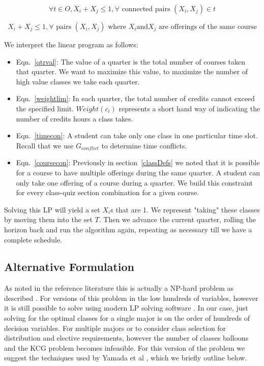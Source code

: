 \documentclass[11pt]{article} %
\begin{document}
\begin{equation}
    \forall t \in O,X_i+X_j \leq 1, \forall \text{ connected pairs } (X_i,X_j) \in t
    \label{timecon}
\end{equation}

\begin{equation}
   X_i + X_j \leq 1, \forall \text{ pairs } (X_i,X_j) \text{ where } X_i \text{and} X_j \text{ are offerings of
   the same course}
    \label{coursecon}
\end{equation}

We interpret the linear program as follows: \begin{itemize} \item
Eqn.~\ref{qtrval}: The value of a quarter is the total number of courses taken
that quarter. We want to maximize this value, to maximize the number of high
value classes we take each quarter. \item Eqn.~\ref{weightlim}: In each quarter,
the total number of credits cannot exceed the specified limit. $Weight(c_i)$
represents a short hand way of indicating the number of credits hours a class
takes. \item Eqn.~\ref{timecon}: A student can take only one class in one particular
time slot. Recall that we use $G_{conflict}$ to determine time conflicts.
\item Eqn.~\ref{coursecon}: Previously in
section~\ref{classDefs} we noted that it is possible for a course to have multiple
offerings during the same quarter. A student can only take one offering
of a course during a quarter. We build this constraint for every class-quiz section
combination for a given course.\end{itemize}

Solving this LP will yield a set $X_i$s that are 1. We represent "taking" these
classes by moving them into the set $T$. Then we advance the current quarter,
rolling the horizon back and run the algorithm again, repeating as necessary
till we have a complete schedule.

\subsection{Alternative Formulation} As noted in the reference literature this
is actually a NP-hard problem as described \cite{pferschy:kcg}.  For versions of
this problem in the low hundreds of variables, however it is still possible to
solve using modern LP solving software \cite{yamada:heuristic}. In our case,
just solving for the optimal classes for a single major is on the order of
hundreds of decision variables. For multiple majors or to
consider class selection for distribution and elective requirements, however the
number of classes balloons and the KCG problem becomes infeasible.
For this version of the problem we suggest the techniques used by Yamada
et al \cite{yamada:heuristic}, which we briefly outline below.
\end{document}
